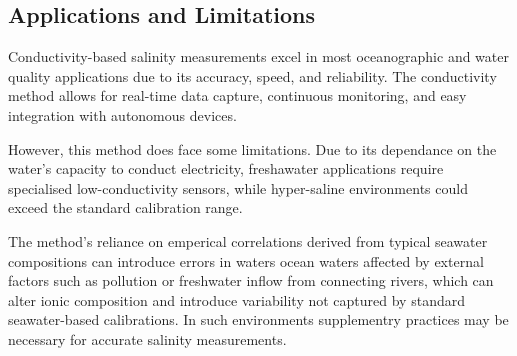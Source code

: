 \subsection{Applications and Limitations}
Conductivity-based salinity measurements excel in most oceanographic and water quality applications due to its accuracy, speed, and reliability.
The conductivity method allows for real-time data capture, continuous monitoring, and easy integration with autonomous devices. 

However, this method does face some limitations. Due to its dependance on the water's capacity to conduct electricity, freshawater applications require specialised low-conductivity sensors, while hyper-saline environments could exceed the standard calibration range.

The method's reliance on emperical correlations derived from typical seawater compositions can introduce errors in waters ocean waters affected by external factors such as pollution or freshwater inflow from connecting rivers, which can alter ionic composition and introduce variability not captured by standard seawater-based calibrations.
In such environments supplementry practices may be necessary for accurate salinity measurements.